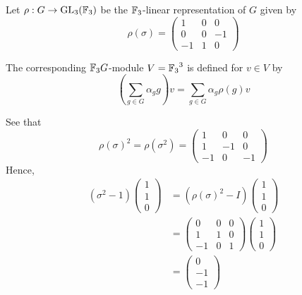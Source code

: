 \documentclass{unswmaths}
\begin{document}
\begin{definition}
    Let $\rho:G \rightarrow \operatorname{GL}_3({\mathbb{F}_3})$ be the ${\mathbb{F}_3}$-linear representation
    of $G$ given by 
    \begin{equation*}
        \rho(\sigma) = \begin{pmatrix} 1 & 0 & 0\\ 
            0 & 0 & -1\\
            -1 & 1 & 0
        \end{pmatrix}
    \end{equation*}
    
    The corresponding ${\mathbb{F}_3} G$-module $V = {\mathbb{F}_3}^3$ is defined for $v \in V$ by
    \begin{equation*}
        \left(\sum_{g\in G} \alpha_g g\right)v = \sum_{g\in G}\alpha_g\rho(g)v
    \end{equation*} 
    
    
    See that
    \begin{equation*}
        \rho(\sigma)^2 = \rho(\sigma^2) = \begin{pmatrix}
            1 & 0 & 0\\
            1 & -1 & 0\\
            -1 & 0 & -1
        \end{pmatrix}   
    \end{equation*}
    Hence,
    \begin{align*}
        (\sigma^2-1)\begin{pmatrix} 1\\1\\0\end{pmatrix} &= ( \rho(\sigma)^2-I)\begin{pmatrix} 1\\1\\0\end{pmatrix}\\
        &=\begin{pmatrix}
            0 & 0 & 0\\
            1 & 1 & 0\\
            -1 & 0 & 1
        \end{pmatrix}
        \begin{pmatrix}
            1\\1\\0
        \end{pmatrix}\\
        &=
        \begin{pmatrix}
            0\\-1\\-1
        \end{pmatrix}
    \end{align*}
    
\end{definition}
\end{document}

